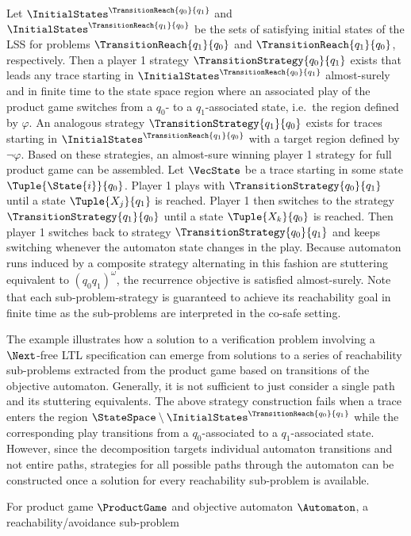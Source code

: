     Let $\InitialStates^\TransitionReach{q_0}{q_1}$ and $\InitialStates^\TransitionReach{q_1}{q_0}$ be the sets of satisfying initial states of the LSS for problems $\TransitionReach{q_1}{q_0}$ and $\TransitionReach{q_1}{q_0}$, respectively.
    Then a player 1 strategy $\TransitionStrategy{q_0}{q_1}$ exists that leads any trace starting in $\InitialStates^\TransitionReach{q_0}{q_1}$ almost-surely and in finite time to the state space region where an associated play of the product game switches from a $q_0$- to a $q_1$-associated state, i.e.\ the region defined by $\varphi$.
    An analogous strategy $\TransitionStrategy{q_1}{q_0}$ exists for traces starting in $\InitialStates^\TransitionReach{q_1}{q_0}$ with a target region defined by $\neg \varphi$.
    Based on these strategies, an almost-sure winning player 1 strategy for full product game can be assembled.
    Let $\VecState$ be a trace starting in some state $\Tuple{\State{i}}{q_0}$.
    Player 1 plays with $\TransitionStrategy{q_0}{q_1}$ until a state $\Tuple{X_j}{q_1}$ is reached.
    Player 1 then switches to the strategy $\TransitionStrategy{q_1}{q_0}$ until a state $\Tuple{X_k}{q_0}$ is reached.
    Then player 1 switches back to strategy $\TransitionStrategy{q_0}{q_1}$ and keeps switching whenever the automaton state changes in the play.
    Because automaton runs induced by a composite strategy alternating in this fashion are stuttering equivalent to $(q_0 q_1)^\omega$, the recurrence objective is satisfied almost-surely.
    Note that each sub-problem-strategy is guaranteed to achieve its reachability goal in finite time as the sub-problems are interpreted in the co-safe setting.

    The example illustrates how a solution to a verification problem involving a $\Next$-free LTL specification can emerge from solutions to a series of reachability sub-problems extracted from the product game based on transitions of the objective automaton.
    Generally, it is not sufficient to just consider a single path and its stuttering equivalents.
    The above strategy construction fails when a trace enters the region $\StateSpace \setminus \InitialStates^\TransitionReach{q_0}{q_1}$ while the corresponding play transitions from a $q_0$-associated to a $q_1$-associated state.
    However, since the decomposition targets individual automaton transitions and not entire paths, strategies for all possible paths through the automaton can be constructed once a solution for every reachability sub-problem is available.

    For product game $\ProductGame$ and objective automaton $\Automaton$, a reachability/avoidance sub-problem

